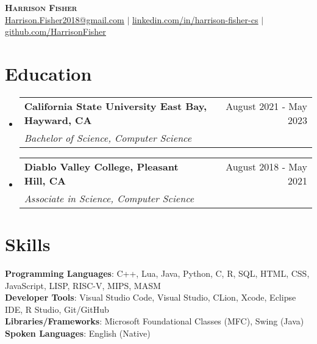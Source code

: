 \documentclass[letterpaper, 11pt]{article}
\makeatletter
\newcommand{\resumeSubheading}[4]{
  \vspace{-2pt}\item
    \begin{tabular*}{0.97\textwidth}[t]{l@{\extracolsep{\fill}}r}
      \textbf{#1} & #2 \\
      \textit{\small#3} & \textit{\small #4} \\
    \end{tabular*}\vspace{-7pt}
}
\newcommand{\resumeSubHeadingListStart}{\begin{itemize}[leftmargin=0.15in, label={}]}
\newcommand{\resumeSubHeadingListEnd}{\end{itemize}}
\makeatother
\begin{document}

\begin{center}
    \textbf{\Huge \scshape Harrison Fisher} \\ \vspace{7pt}
    \href{Harrison.Fisher2018@gmail.com}{\underline{Harrison.Fisher2018@gmail.com}} $ | $ 
    \href{https://www.linkedin.com/in/harrison-fisher-cs/}{\underline{\faLinkedin \hspace{1pt} linkedin.com/in/harrison-fisher-cs}} $ | $
    \href{https://github.com/HarrisonFisher}{\underline{\faGithub \hspace{1pt} github.com/HarrisonFisher}}
\end{center}




  

\section{Education}
  \resumeSubHeadingListStart
    \resumeSubheading
      {California State University East Bay, Hayward, CA}{August 2021 - May 2023}
      {Bachelor of Science, Computer Science}{}

    \resumeSubheading
      {Diablo Valley College, Pleasant Hill, CA}{August 2018 - May 2021}
      {Associate  in Science, Computer Science}{}
  \resumeSubHeadingListEnd
  
\section{Skills}
 \begin{itemize}[leftmargin=0.15in, label={}]
    \small{\item{
     \textbf{Programming Languages}{: C++, Lua, Java, Python, C, R, SQL, HTML, CSS, JavaScript, LISP, RISC-V, MIPS, MASM} \\
     \textbf{Developer Tools}{: Visual Studio Code, Visual Studio, CLion, Xcode, Eclipse IDE, R Studio, Git/GitHub} \\
     \textbf{Libraries/Frameworks}{: Microsoft Foundational Classes (MFC), Swing (Java)} \\
     \textbf{Spoken Languages}{: English (Native)} \\
    }}
 \end{itemize}
\end{document}
